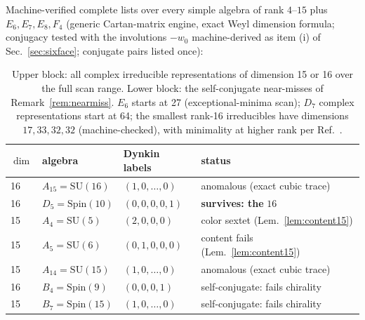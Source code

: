 \documentclass[
  aps,
  prd,
  preprint,
  nofootinbib,
  superscriptaddress,
  longbibliography
]{revtex4-2}
\newcommand{\Spin}{\mathrm{Spin}}
\newcommand{\SU}{\mathrm{SU}}
\begin{document}
Machine-verified complete lists over every simple algebra of rank
\(4\)--\(15\) plus \(E_6,E_7,E_8,F_4\) (generic Cartan-matrix engine, exact
Weyl dimension formula; conjugacy tested with the involutions \(-w_0\)
machine-derived as item (i) of Sec.~\ref{sec:sixface}; conjugate pairs
listed once):

\begin{table}[!htbp]
\centering
\begin{tabular}{llll}
\toprule
\(\dim\) & algebra & Dynkin labels & status\\
\midrule
16 & \(A_{15}=\SU(16)\) & \((1,0,\ldots,0)\) & anomalous (exact cubic trace)\\
16 & \(D_5=\Spin(10)\) & \((0,0,0,0,1)\) & \textbf{survives: the }\(16\)\\
15 & \(A_4=\SU(5)\) & \((2,0,0,0)\) & color sextet (Lem.~\ref{lem:content15})\\
15 & \(A_5=\SU(6)\) & \((0,1,0,0,0)\) & content fails (Lem.~\ref{lem:content15})\\
15 & \(A_{14}=\SU(15)\) & \((1,0,\ldots,0)\) & anomalous (exact cubic trace)\\
\midrule
16 & \(B_4=\Spin(9)\) & \((0,0,0,1)\) & self-conjugate: fails chirality\\
15 & \(B_7=\Spin(15)\) & \((1,0,\ldots,0)\) & self-conjugate: fails chirality\\
\bottomrule
\end{tabular}
\caption{Upper block: all complex irreducible representations of dimension
15 or 16 over the full scan range.  Lower block: the self-conjugate
near-misses of Remark~\ref{rem:nearmiss}.  \(E_6\) starts at 27
(exceptional-minima scan); \(D_7\) complex representations start at 64; the
smallest rank-16 irreducibles have dimensions \(17,33,32,32\)
(machine-checked), with minimality at higher rank per
Ref.~\cite{Slansky1981}.}
\label{tab:enumeration}
\end{table}

\FloatBarrier



\end{document}
